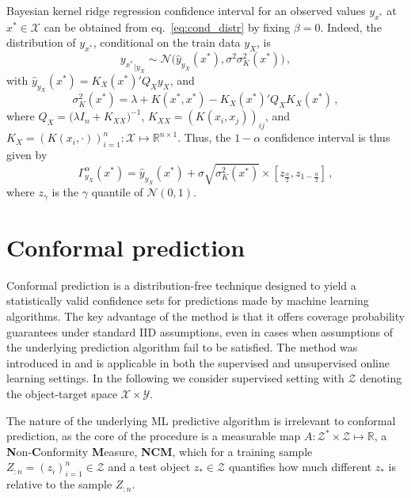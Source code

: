 \documentclass[a4paper,14pt]{extarticle}
\newcommand{\Ncal}{\mathcal{N}}
\newcommand{\Xcal}{\mathcal{X}}
\newcommand{\Ycal}{\mathcal{Y}}
\newcommand{\Zcal}{\mathcal{Z}}
\newcommand{\Real}{\mathbb{R}}
\begin{document}
Bayesian kernel ridge regression confidence interval for an observed values $y_{x^*}$
at $x^*\in \Xcal$ can be obtained from eq.~\ref{eq:cond_distr} by fixing $\beta = 0$.
Indeed, the distribution of $y_{x^*}$, conditional on the train data $y_X$, is
\begin{equation} \label{eq:gp_cond_dist}
{y_{x^*}}_{|y_X}
  \sim \Ncal\bigl( \hat{y}_{y_X}(x^*), \sigma^2 \sigma_K^2(x^*) \bigr) \,,
\end{equation}
with $\hat{y}_{y_X}(x^*) = K_X(x^*)' Q_X y_X$, and
\begin{equation*}
  \sigma_K^2(x^*)
    = \lambda + K(x^*, x^*) - K_X(x^*)' Q_X K_X(x^*) \,,
\end{equation*}
where $Q_X = \bigl(\lambda I_n + K_{XX}\bigr)^{-1}$, $K_{XX} = (K(x_i,x_j))_{ij}$,
and $K_X = (K(x_i, \cdot))_{i=1}^n: \Xcal \mapsto \Real^{n\times1}$. Thus, the $1 - \alpha$
confidence interval is thus given by
\begin{equation} \label{eq:gp_conf_int}
\Gamma^\alpha_{y_X}(x^*)
  = \hat{y}_{y_X}(x^*)
  + \sigma \sqrt{\sigma_K^2(x^*)}
  \times [z_{\frac{\alpha}{2}}, z_{1-\frac{\alpha}{2}}]
  \,,
\end{equation}
where $z_\gamma$ is the $\gamma$ quantile of $\Ncal(0, 1)$.



\section{Conformal prediction} %
\label{sec:conformal_prediction}

Conformal prediction is a distribution-free technique designed to yield a statistically
valid confidence sets for predictions made by machine learning algorithms. The key
advantage of the method is that it offers coverage probability guarantees under standard
IID assumptions, even in cases when assumptions of the underlying prediction algorithm
fail to be satisfied. The method was introduced in \cite{vovk2005} and is applicable
in both the supervised and unsupervised online learning settings. In the following
we consider supervised setting with $\Zcal$ denoting the object-target space $\Xcal \times \Ycal$.

The nature of the underlying ML predictive algorithm is irrelevant to conformal
prediction, as the core of the procedure is a measurable map $A: \Zcal^*\times \Zcal \mapsto \Real$,
a \textbf{N}on-\textbf{C}onformity \textbf{M}easure, \textbf{NCM}, which for a training
sample $Z_{:n}=(z_i)_{i=1}^n\in\Zcal$ and a test object $z_* \in \Zcal$ quantifies
how much different $z_*$ is relative to the sample $Z_{:n}$.
\end{document}
